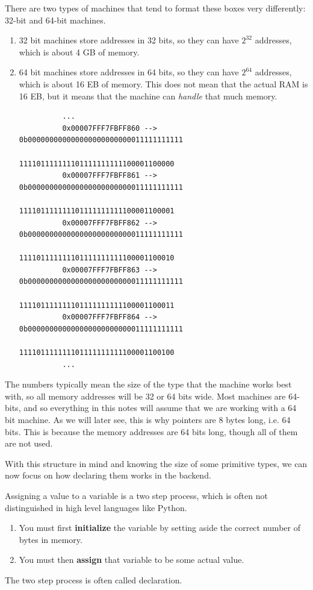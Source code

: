 \documentclass{article}
\begin{document}
    \begin{definition}
      There are two types of machines that tend to format these boxes very differently: 32-bit and 64-bit machines. 
      \begin{enumerate}
        \item 32 bit machines store addresses in 32 bits, so they can have $2^{32}$ addresses, which is about 4 GB of memory. 
        \item 64 bit machines store addresses in 64 bits, so they can have $2^{64}$ addresses, which is about 16 EB of memory. This does not mean that the actual RAM is 16 EB, but it means that the machine can \textit{handle} that much memory. 
        \begin{lstlisting} 
          ...
          0x00007FFF7FBFF860 --> 0b000000000000000000000000011111111111
                                 111101111111101111111111100001100000
          0x00007FFF7FBFF861 --> 0b000000000000000000000000011111111111
                                 111101111111101111111111100001100001
          0x00007FFF7FBFF862 --> 0b000000000000000000000000011111111111
                                 111101111111101111111111100001100010
          0x00007FFF7FBFF863 --> 0b000000000000000000000000011111111111
                                 111101111111101111111111100001100011
          0x00007FFF7FBFF864 --> 0b000000000000000000000000011111111111
                                 111101111111101111111111100001100100
          ...
        \end{lstlisting}
      \end{enumerate}
      The numbers typically mean the size of the type that the machine works best with, so all memory addresses will be 32 or 64 bits wide. Most machines are 64-bits, and so everything in this notes will assume that we are working with a 64 bit machine. As we will later see, this is why pointers are 8 bytes long, i.e. 64 bits. This is because the memory addresses are 64 bits long, though all of them are not used. 
    \end{definition}

    With this structure in mind and knowing the size of some primitive types, we can now focus on how declaring them works in the backend. 

    \begin{definition}
      Assigning a value to a variable is a two step process, which is often not distinguished in high level languages like Python. 
      \begin{enumerate}
        \item You must first \textbf{initialize} the variable by setting aside the correct number of bytes in memory. 
        \item You must then \textbf{assign} that variable to be some actual value. 
      \end{enumerate}
      The two step process is often called declaration. 
    \end{definition}
\end{document}

